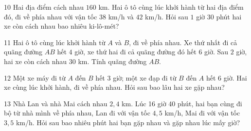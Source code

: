 \gap
\begin{probbox}{10}{\relax}
Hai địa điểm cách nhau $160$ km. Hai ô tô cùng lúc khởi hành từ hai địa điểm đó, đi về phía nhau với vận tốc $38$ km/h và $42$ km/h. Hỏi sau $1$ giờ $30$ phút hai xe còn cách nhau bao nhiêu ki-lô-mét?
\end{probbox}
\gap
\begin{probbox}{11}{\relax}
Hai ô tô cùng lúc khởi hành từ $A$ và $B$, đi về phía nhau. Xe thứ nhất đi cả quãng đường $AB$ hết $4$ giờ, xe thứ hai đi cả quãng đường đó hết $6$ giờ. Sau $2$ giờ, hai xe còn cách nhau $30$ km. Tính quãng đường $AB$.
\end{probbox}
\gap
\begin{probbox}{12}{\relax}
Một xe máy đi từ $A$ đến $B$ hết $3$ giờ; một xe đạp đi từ $B$ đến $A$ hết $6$ giờ. Hai xe cùng lúc khởi hành, đi về phía nhau. Hỏi sau bao lâu hai xe gặp nhau?
\end{probbox}
\gap
\begin{probbox}{13}{\relax}
Nhà Lan và nhà Mai cách nhau $2{,}4$ km. Lúc 16 giờ 40 phút, hai bạn cùng đi bộ từ nhà mình về phía nhau, Lan đi với vận tốc $4{,}5$ km/h, Mai đi với vận tốc $3{,}5$ km/h. Hỏi sau bao nhiêu phút hai bạn gặp nhau và gặp nhau lúc mấy giờ?
\end{probbox}

